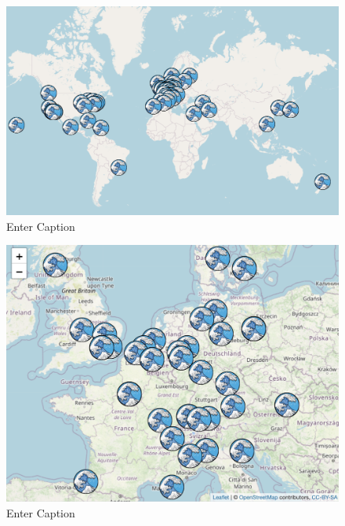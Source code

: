 \documentclass[a4paper, twoside, 12pt]{book}
\begin{document}
\begin{figure}
    \centering
    \includegraphics[width=1\linewidth]{Screenshot 2023-06-14 at 23.48.44.png}
    \caption{Enter Caption}
    \label{fig:enter-label}
\end{figure}
\begin{figure}
    \centering
    \includegraphics[width=1\linewidth]{KSqQE 2.png}
    \caption{Enter Caption}
    \label{fig:enter-label}
\end{figure}
\end{document}
